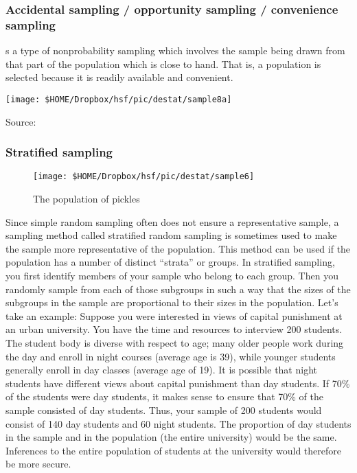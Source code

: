\subsubsection{Accidental sampling / opportunity sampling / convenience sampling}
s a type of nonprobability sampling which involves the sample being drawn from that part of the population which is close to hand. That is, a population is selected because it is readily available and convenient.
\begin{center}\texttt{[image: \$HOME/Dropbox/hsf/pic/destat/sample8a]}
	
	Source: \citet[p. 92]{Gonick1993Cartoon}\end{center}


\subsubsection{Stratified sampling}

\begin{figure}[h]
\centering
\texttt{[image: \$HOME/Dropbox/hsf/pic/destat/sample6]}
		\caption{The population of pickles}
		
\end{figure}

Since simple random sampling often does not ensure a representative sample, a
sampling method called stratified random sampling is sometimes used to make the
sample more representative of the population. This method can be used if the
population has a number of distinct ``strata'' or groups. In stratified sampling, you
first identify members of your sample who belong to each group. Then you
randomly sample from each of those subgroups in such a way that the sizes of the
subgroups in the sample are proportional to their sizes in the population.
Let's take an example: Suppose you were interested in views of capital
punishment at an urban university. You have the time and resources to interview
200 students. The student body is diverse with respect to age; many older people
work during the day and enroll in night courses (average age is 39), while younger
students generally enroll in day classes (average age of 19). It is possible that night
students have different views about capital punishment than day students. If 70\%
of the students were day students, it makes sense to ensure that 70\% of the sample
consisted of day students. Thus, your sample of 200 students would consist of 140
day students and 60 night students. The proportion of day students in the sample
and in the population (the entire university) would be the same. Inferences to the
entire population of students at the university would therefore be more secure.


